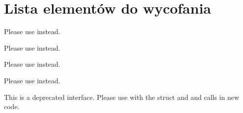 \chapter{Lista elementów do wycofania}
\hypertarget{deprecated}{}\label{deprecated}

\begin{DoxyRefList}
\item[Składowa \doxylink{vorbisenc_8h_a34c3170d227b6368041e59c1dc7ed6e4}{OV\+\_\+\+ECTL\+\_\+\+RATEMANAGE\+\_\+\+AVG} ]\label{deprecated__deprecated000004}%
%
Please use  instead. 
\item[Składowa \doxylink{vorbisenc_8h_a614481c0d84bdfbb80eed9208b68f779}{OV\+\_\+\+ECTL\+\_\+\+RATEMANAGE\+\_\+\+GET} ]\label{deprecated__deprecated000002}%
%
Please use  instead. 
\item[Składowa \doxylink{vorbisenc_8h_af8869980a805f431af57a50dffbf5d33}{OV\+\_\+\+ECTL\+\_\+\+RATEMANAGE\+\_\+\+HARD} ]\label{deprecated__deprecated000005}%
%
Please use  instead. 
\item[Składowa \doxylink{vorbisenc_8h_a1daa1fd8ce1064cce01dde3ad447d389}{OV\+\_\+\+ECTL\+\_\+\+RATEMANAGE\+\_\+\+SET} ]\label{deprecated__deprecated000003}%
%
Please use  instead. 
\item[Struct \doxylink{structovectl__ratemanage__arg}{ovectl\+\_\+ratemanage\+\_\+arg} ]\label{deprecated__deprecated000001}%
%
This is a deprecated interface. Please use  with the  struct and  and  calls in new code. 
\item[Struct \doxylink{structsf_1_1_event_1_1_mouse_wheel_event}{sf\+::Event\+::Mouse\+Wheel\+Event} ]\label{deprecated__deprecated000023}%

\end{DoxyRefList}
